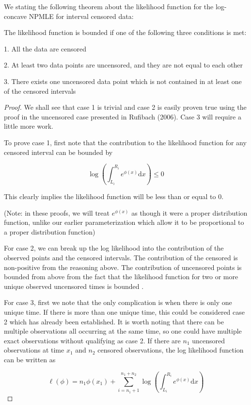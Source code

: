 	We stating the following theorem about the likelihood function for the log-concave NPMLE for interval censored data:
		
	The likelihood function is bounded if one of the following three conditions is met:
	
	1. All the data are censored
	
	2. At least two data points are uncensored, and they are not equal to each other
	
	3. There exists one uncensored data point which is not contained in at least one of the censored intervals
		
	\begin{proof}
	
	We shall see that case 1 is trivial and case 2 is easily proven true using the proof in the uncensored case presented in Rufibach (2006). Case 3 will require a little more work. 
	
	To prove case 1, first note that the contribution to the likelihood function for any censored interval can be bounded by
	
	\[
	\displaystyle \log \left( \int_{L_i}^{R_i} e^{\phi(x)} \mathrm{d}x \right) \leq 0
	\]
	
	This clearly implies the likelihood function will be less than or equal to 0. 

	(Note: in these proofs, we will treat $e^{\phi(x)}$ as though it were a proper distribution function, unlike our earlier parameterization which allow it to be proportional to a proper distribution function)
		
	For case 2, we can break up the log likelihood into the contribution of the observed points and the censored intervals. The contribution of the censored is non-positive from the reasoning above. The contribution of uncensored points is bounded from above from the fact that the likelihood function for two or more unique observed uncensored times is bounded \cite{RefRuf2006}.
	
	For case 3, first we note that the only complication is when there is only one unique time. If there is more than one unique time, this could be considered case 2 which has already been established. It is worth noting that there can be multiple observations all occurring at the same time, so one could have multiple exact observations without qualifying as case 2. If there are $n_1$ uncensored observations at time $x_1$ and $n_2$ censored observations, the log likelihood function can be written as
	
	\[
	\ell (\phi) = \displaystyle  n_1\phi(x_1) + \sum_{i = n_1+ 1} ^{n_1 + n_2} \log \left( \int_{L_i}^{R_i} e^{\phi(x) } \mathrm{d}x \right)
	\]
	

\end{proof}

